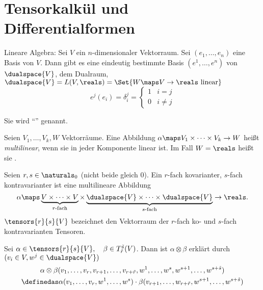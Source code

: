 \section{Tensorkalkül und Differentialformen}
Lineare Algebra: Sei \( V \) ein \( n \)-dimensionaler Vektorraum.
Sei \( (e_1,\ldots ,e_n) \) eine Basis von \( V \). 
Dann gibt es eine eindeutig bestimmte Basis \( (e^1,\ldots ,e^n) \) von \( \dualspace{V} \), dem Dualraum, \( \dualspace{V}=L(V,\reals)=\Set{W\maps V\to\reals \text{ linear} } \)
\sd 
\begin{equation*}
e^j(e_i)=\delta_i^j=\begin{cases}
    1 & i=j\\
    0 & i\neq j
\end{cases}
\end{equation*}

Sie wird \enquote{} genannt.

\begin{definition}
Seien \( V_1,\dotsc ,V_k,W \) Vektorräume. 
Eine Abbildung \( \alpha\maps V_1\times \dotsb \times V_k\to W \) heißt \emph{multilinear}, wenn sie in jeder Komponente linear ist.
Im Fall \( W=\reals \) heißt sie .

Seien \( r,s\in \naturals_0 \) (nicht beide gleich 0).
Ein \( r \)-fach kovarianter, \( s \)-fach kontravarianter  ist eine multilineare Abbildung
\begin{equation*}
    \alpha\maps \underbrace{V\times \dotsb \times V}_{\text{\( r \)-fach}}\times 
    \underbrace{\dualspace{V}\times \dotsb \times \dualspace{V}}_{\text{\( s \)-fach}}
    \to\reals.
\end{equation*}
\( \tensors{r}{s}{V} \) bezeichnet den Vektorraum der \( r \)-fach ko- und \( s \)-fach kontravarianten Tensoren.
\end{definition}

\begin{definition}
Sei \( \alpha\in \tensors{r}{s}{V},\quad \beta\in T_{\tilde{r}}^{\tilde{s}}(V) \).
Dann ist \( \alpha\otimes\beta \) erklärt durch \( (v_i\in V,w^j\in \dualspace{V}) \)
\begin{gather*}
    \alpha\otimes\beta(v_1,\ldots ,v_r,v_{r+1},\ldots ,v_{r+\tilde{r}},
    w^1,\ldots ,w^s,w^{s+1},\ldots ,w^{s+\tilde{s}})\\
    \definedas \alpha(v_1,\ldots ,v_r,w^1,\ldots ,w^s)\cdot 
    \beta(v_{r+1},\ldots ,w_{r+\tilde{r}},w^{s+1},\ldots ,w^{s+\tilde{s}})
\end{gather*}
\end{definition}

